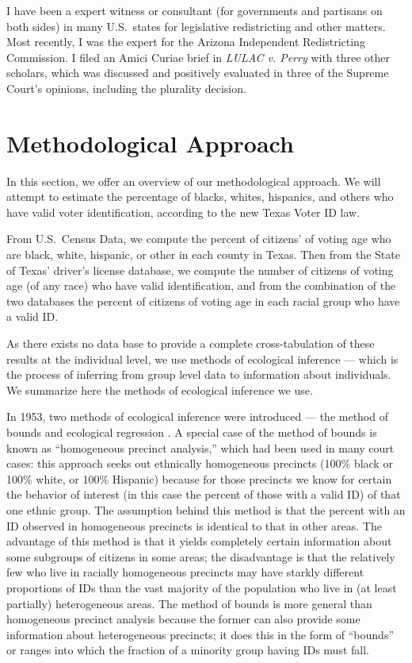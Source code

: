 \documentclass[12pt]{article}
\begin{document}
I have been a expert witness or consultant (for governments and
partisans on both sides) in many U.S.\ states for legislative
redistricting and other matters.  Most recently, I was the expert for
the Arizona Independent Redistricting Commission.  I filed an Amici
Curiae brief in \emph{LULAC v. Perry} with three other scholars, which
was discussed and positively evaluated in three of the Supreme Court's
opinions, including the plurality decision.

\section{Methodological Approach}\label{s:methods}

In this section, we offer an overview of our methodological approach.
We will attempt to estimate the percentage of blacks, whites,
hispanics, and others who have valid voter identification, according
to the new Texas Voter ID law.  

From U.S.\ Census Data, we compute the percent of citizens' of voting
age who are black, white, hispanic, or other in each county in
Texas.  Then from the State of Texas' driver's license database, we
compute the number of citizens of voting age (of any race) who have
valid identification, and from the combination of the two databases
the percent of citizens of voting age in each racial group who have a valid ID.  

As there exists no data base to provide a complete cross-tabulation of
these results at the individual level, we use methods of ecological
inference --- which is the process of inferring from group level data
to information about individuals.  We summarize here the methods of
ecological inference we use.

In 1953, two methods of ecological inference were introduced --- the
method of bounds \citep{DunDav53} and ecological regression
\citep{Goodman53}. A special case of the method of bounds is known as
``homogeneous precinct analysis,'' which had been used in many court
cases: this approach seeks out ethnically homogeneous precincts (100\%
black or 100\% white, or 100\% Hispanic) because for those precincts
we know for certain the behavior of interest (in this case the percent
of those with a valid ID) of that one ethnic group.  The assumption
behind this method is that the percent with an ID observed in
homogeneous precincts is identical to that in other areas. The
advantage of this method is that it yields completely certain
information about some subgroups of citizens in some areas; the
disadvantage is that the relatively few who live in racially
homogeneous precincts may have starkly different proportions of IDs
than the vast majority of the population who live in (at least
partially) heterogeneous areas.  The method of bounds is more general
than homogeneous precinct analysis because the former can also provide
some information about heterogeneous precincts; it does this in the
form of ``bounds'' or ranges into which the fraction of a minority
group having IDs must fall.
\end{document}
